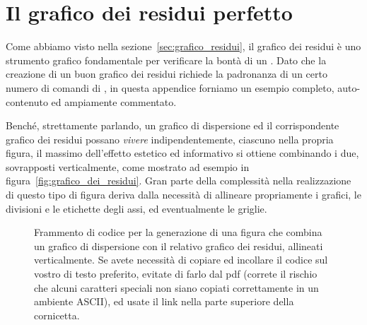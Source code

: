\chapter{Il grafico dei residui perfetto}

Come abbiamo visto nella sezione~\ref{sec:grafico_residui}, il grafico dei residui
è uno strumento grafico fondamentale per verificare la bontà di un \fit.
Dato che la creazione di un buon grafico dei residui richiede la padronanza
di un certo numero di comandi di \matplotlib, in questa appendice forniamo un
esempio completo, auto-contenuto ed ampiamente commentato.

Benché, strettamente parlando, un grafico di dispersione ed il corrispondente
grafico dei residui possano \emph{vivere} indipendentemente, ciascuno nella propria
figura, il massimo dell'effetto estetico ed informativo si ottiene combinando i
due, sovrapposti verticalmente, come mostrato ad esempio
in figura~\ref{fig:grafico_dei_residui}.
Gran parte della complessità nella realizzazione di questo tipo di figura deriva
dalla necessità di allineare propriamente i grafici, le divisioni e le etichette
degli assi, ed eventualmente le griglie.


\begin{figure}[htbp!]
  
  \caption{Frammento di codice per la generazione di una figura che combina un
  grafico di dispersione con il relativo grafico dei residui, allineati verticalmente.
  Se avete necessità di copiare ed incollare il codice sul vostro 
  di testo preferito, evitate di farlo dal pdf (correte il rischio che alcuni
  caratteri speciali non siano copiati correttamente in un ambiente ASCII), ed usate il
  link nella parte superiore della cornicetta.}
  \label{fig:grafico_residui}
\end{figure}

